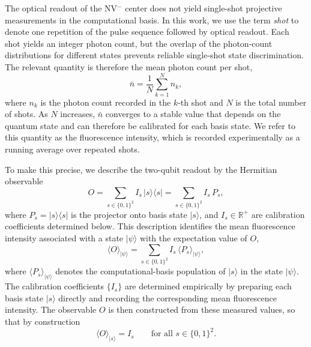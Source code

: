 \documentclass[conference]{IEEEtran}
\begin{document}
The optical readout of the NV\(^-\) center does not yield single-shot projective
measurements in the computational basis. In this work, we use the term
\emph{shot} to denote one repetition of the pulse sequence followed by optical
readout. Each shot yields an integer photon count, but the overlap of the
photon-count distributions for different states prevents reliable single-shot
state discrimination. The relevant quantity is therefore the mean photon count
per shot,
\begin{equation}
    \bar{n} = \frac{1}{N}\sum_{k=1}^{N} n_k,
    \label{eq:mean_photon_count_per_shot}
\end{equation}
where \(n_k\) is the photon count recorded in the \(k\)-th shot and \(N\) is the
total number of shots. As \(N\) increases, \(\bar{n}\) converges to a stable
value that depends on the quantum state and can therefore be calibrated for each
basis state. We refer to this quantity as the fluorescence intensity, which is
recorded experimentally as a running average over repeated shots.

To make this precise, we describe the two-qubit readout by the Hermitian
observable
\begin{equation}
    O = \sum_{s\in\{0,1\}^2} I_s\,|s\rangle\langle s|
      = \sum_{s\in\{0,1\}^2} I_s\,P_s,
    \label{eq:measurement_observable}
\end{equation}
where \(P_s = |s\rangle\langle s|\) is the projector onto basis state
\(|s\rangle\), and \(I_s \in \mathbb{R}^+\) are calibration coefficients
determined below. This description identifies the mean fluorescence intensity
associated with a state \(|\psi\rangle\) with the expectation value of \(O\),
\begin{equation}
    \langle O\rangle_{|\psi\rangle}
    = \sum_{s\in\{0,1\}^2} I_s\,\langle P_s\rangle_{|\psi\rangle},
    \label{eq:observable_expectation}
\end{equation}
where \(\langle P_s\rangle_{|\psi\rangle}\) denotes the computational-basis
population of \(|s\rangle\) in the state \(|\psi\rangle\). The calibration
coefficients \(\{I_s\}\) are determined empirically by preparing each basis
state \(|s\rangle\) directly and recording the corresponding mean fluorescence
intensity. The observable \(O\) is then constructed from these measured values,
so that by construction
\begin{equation}
    \langle O\rangle_{|s\rangle} = I_s
    \qquad\text{for all } s\in\{0,1\}^2.
    \label{eq:calibration_values}
\end{equation}
\end{document}
